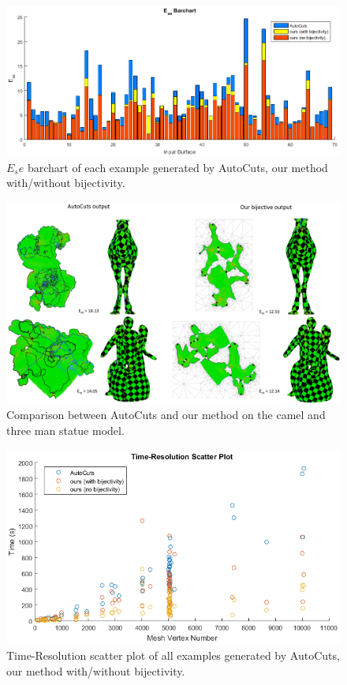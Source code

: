 \begin{figure}[!h]
\centering
\includegraphics[width=\linewidth]{fig/EseBar_compAutoCuts.png}
\caption{$E_se$ barchart of each example generated by AutoCuts, our method with/without bijectivity.}
\label{fig:EseBar_compAutoCuts}
\end{figure}

\begin{figure}[!h]
\centering
\includegraphics[width=\linewidth]{fig/comp_AutoCuts.png}
\caption{Comparison between AutoCuts and our method on the camel and three man statue model.}
\label{fig:comp_AutoCuts}
\end{figure}

\begin{figure}[!h]
\centering
\includegraphics[width=\linewidth]{fig/time_res_compAutoCuts.png}
\caption{Time-Resolution scatter plot of all examples generated by AutoCuts, our method with/without bijectivity.}
\label{fig:time_res_compAutoCuts}
\end{figure}

